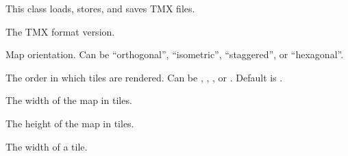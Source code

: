 \documentclass[letterpaper,10pt,english]{sphinxmanual}
\begin{document}
\begin{fulllineitems}
\label{index:tmx.TileMap}
This class loads, stores, and saves TMX files.

\begin{fulllineitems}
\label{index:tmx.TileMap.version}
The TMX format version.

\end{fulllineitems}


\begin{fulllineitems}
\label{index:tmx.TileMap.orientation}
Map orientation.  Can be ``orthogonal'', ``isometric'', ``staggered'',
or ``hexagonal''.

\end{fulllineitems}


\begin{fulllineitems}
\label{index:tmx.TileMap.renderorder}
The order in which tiles are rendered.  Can be ,
, , or .  Default is
.

\end{fulllineitems}


\begin{fulllineitems}
\label{index:tmx.TileMap.width}
The width of the map in tiles.

\end{fulllineitems}


\begin{fulllineitems}
\label{index:tmx.TileMap.height}
The height of the map in tiles.

\end{fulllineitems}


\begin{fulllineitems}
\label{index:tmx.TileMap.tilewidth}
The width of a tile.


\end{fulllineitems}
\end{fulllineitems}
\end{document}
